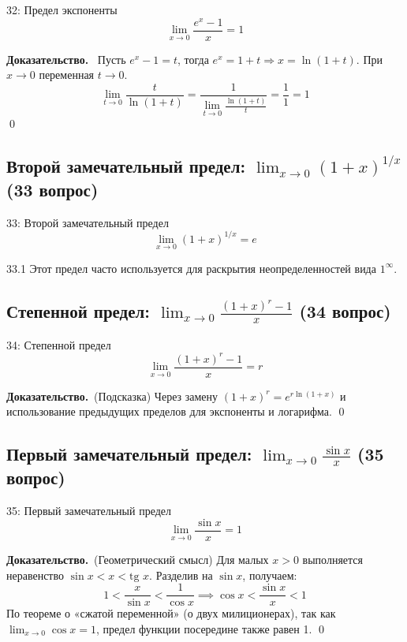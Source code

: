 \documentclass[a4paper,12pt]{article}
\newcommand{\tsubsection}[2]{\subsection[#1]{\texorpdfstring{#2}{#1}}}
\newcommand{\myproof}{\textbf{Доказательство.}\ }
\begin{document}
	\begin{theorembox}{32: Предел экспоненты}
		\[ \lim_{x \rightarrow 0} \frac{e^x - 1}{x} = 1 \]
	\end{theorembox}
	
	\myproof
	Пусть $e^x - 1 = t$, тогда $e^x = 1 + t \Rightarrow x = \ln(1+t)$.
	При $x \rightarrow 0$ переменная $t \rightarrow 0$.
	\[ \lim_{t \rightarrow 0} \frac{t}{\ln(1+t)} = \frac{1}{\lim_{t \rightarrow 0} \frac{\ln(1+t)}{t}} = \frac{1}{1} = 1 \] \qed
	
	
	
	\vspace{1cm}
	\tsubsection{Второй замечательный предел (33 вопрос)}{Второй замечательный предел: $\lim_{x \rightarrow 0} (1+x)^{1/x}$ (33 вопрос)}
	
	\begin{theorembox}{33: Второй замечательный предел}
		\[ \lim_{x \rightarrow 0} (1+x)^{1/x} = e \]
	\end{theorembox}
	
	\begin{remarkbox}{33.1}
		Этот предел часто используется для раскрытия неопределенностей вида $1^\infty$.
	\end{remarkbox}
	
	
	
	\vspace{1cm}
	\tsubsection{Степенной предел (34 вопрос)}{Степенной предел: $\lim_{x \rightarrow 0} \frac{(1+x)^r - 1}{x}$ (34 вопрос)}
	
	\begin{theorembox}{34: Степенной предел}
		\[ \lim_{x \rightarrow 0} \frac{(1+x)^r - 1}{x} = r \]
	\end{theorembox}
	
	\myproof (Подсказка)
	Через замену $(1+x)^r = e^{r \ln(1+x)}$ и использование предыдущих пределов для экспоненты и логарифма. \qed
	
	
	
	
	\vspace{1cm}
	\tsubsection{Первый замечательный предел (35 вопрос)}{Первый замечательный предел: $\lim_{x \rightarrow 0} \frac{\sin x}{x}$ (35 вопрос)}
	
	\begin{theorembox}{35: Первый замечательный предел}
		\[ \lim_{x \rightarrow 0} \frac{\sin x}{x} = 1 \]
	\end{theorembox}
	
	\myproof (Геометрический смысл)
	Для малых $x > 0$ выполняется неравенство $\sin x < x < \text{tg } x$.
	Разделив на $\sin x$, получаем:
	\[ 1 < \frac{x}{\sin x} < \frac{1}{\cos x} \implies \cos x < \frac{\sin x}{x} < 1 \]
	По теореме о «сжатой переменной» (о двух милиционерах), так как $\lim_{x \rightarrow 0} \cos x = 1$, предел функции посередине также равен 1. \qed
		
\end{document}

